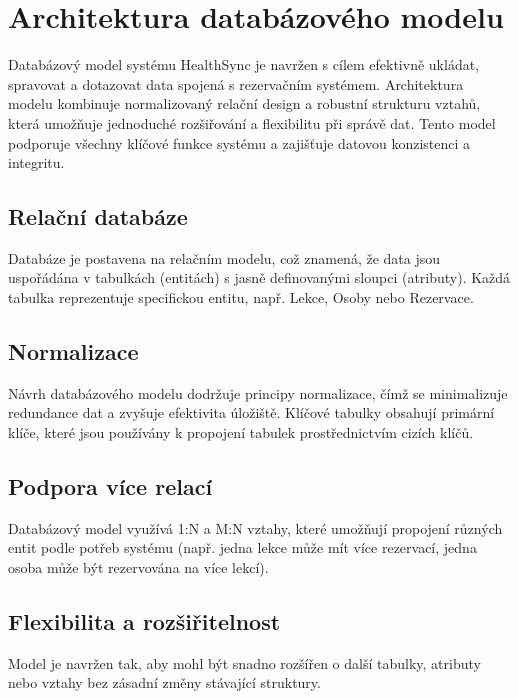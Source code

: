 \documentclass[12pt, a4paper,
openright
]{report}
\begin{document}
\section{Architektura databázového modelu}
\label{sec:zakladni_struktura}

Databázový model systému HealthSync je navržen s cílem efektivně ukládat, spravovat a dotazovat data spojená s rezervačním systémem. Architektura modelu kombinuje normalizovaný relační design a robustní strukturu vztahů, která umožňuje jednoduché rozšiřování a flexibilitu při správě dat. Tento model podporuje všechny klíčové funkce systému a zajišťuje datovou konzistenci a integritu.

\subsection{Relační databáze}
Databáze je postavena na relačním modelu, což znamená, že data jsou uspořádána v tabulkách (entitách) s jasně definovanými sloupci (atributy).
Každá tabulka reprezentuje specifickou entitu, např. Lekce, Osoby nebo Rezervace.

\subsection{Normalizace}
Návrh databázového modelu dodržuje principy normalizace, čímž se minimalizuje redundance dat a zvyšuje efektivita úložiště.
Klíčové tabulky obsahují primární klíče, které jsou používány k propojení tabulek prostřednictvím cizích klíčů. 

\subsection{Podpora více relací}
Databázový model využívá 1:N a M:N vztahy, které umožňují propojení různých entit podle potřeb systému (např. jedna lekce může mít více rezervací, jedna osoba může být rezervována na více lekcí).


\subsection{Flexibilita a rozšiřitelnost}
Model je navržen tak, aby mohl být snadno rozšířen o další tabulky, atributy nebo vztahy bez zásadní změny stávající struktury.
\end{document}
